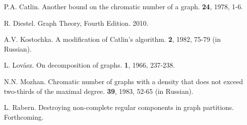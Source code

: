 \documentclass[12pt]{amsart}
\theoremstyle{plain}
\theoremstyle{definition}
\theoremstyle{remark}
\begin{document}
\begin{thebibliography}{1}
P.A. Catlin.
\newblock Another bound on the chromatic number of a graph.
 \textbf{24}, 1978, \mbox{1-6}.

R. Diestel.
\newblock Graph Theory, Fourth Edition.
 2010.

A.V. Kostochka. 
\newblock A modification of Catlin's algorithm.
 \textbf{2}, 1982, \mbox{75-79} (in Russian).

L. Lov\'{a}sz.
\newblock On decomposition of graphs.
 \textbf{1}, 1966, \mbox{237-238}.

N.N. Mozhan.
\newblock Chromatic number of graphs with a density that does not exceed two-thirds of the maximal degree.
 \textbf{39}, 1983, \mbox{52-65} (in Russian).

L. Rabern.
\newblock Destroying non-complete regular components
in graph partitions.
 Forthcoming.
\end{thebibliography}
\end{document}

